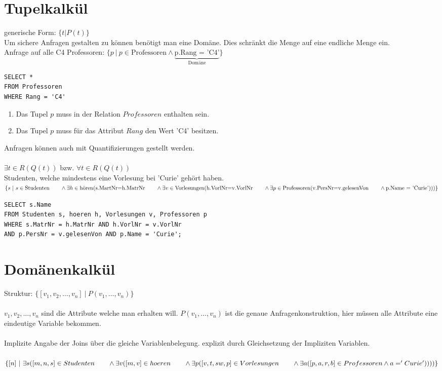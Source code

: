 \section{Tupelkalkül}
generische Form: $\{t|P(t)\}$\\
Um sichere Anfragen gestalten zu können benötigt man eine Domäne. Dies schränkt die Menge auf eine endliche Menge ein.\\
Anfrage auf alle C4 Professoren: $\{p~|~p\in \text{Professoren} \wedge \underbrace{\text{p.Rang = 'C4'}}_{\text{Domäne}}\}$
\begin{lstlisting}
SELECT * 
FROM Professoren
WHERE Rang = 'C4'
\end{lstlisting}
\begin{enumerate}
\item Das Tupel $p$ muss in der Relation $Professoren$ enthalten sein.
\item Das Tupel $p$ muss für das Attribut $Rang$ den Wert 'C4' besitzen. 
\end{enumerate}
Anfragen können auch mit Quantifizierungen gestellt werden.\\
\qquad\\
$\exists t \in R(Q(t))$ bzw. $\forall t \in R(Q(t))$\\
Studenten, welche mindestens eine Vorlesung bei 'Curie' gehört haben.\\
$\{s~|~s \in \text{Studenten}\\
\text{\qquad}\wedge \exists h \in \text{hören}(\text{s.MartNr=h.MatrNr}\\
\text{\qquad } \wedge \exists v \in \text{Vorlesungen}(\text{h.VorlNr=v.VorlNr}\\
\text{\qquad } \wedge \exists p \in \text{Professoren}(\text{v.PersNr=v.gelesenVon}\\
\text{\qquad } \wedge \text{p.Name = 'Curie'})))\}$
\begin{lstlisting}
SELECT s.Name
FROM Studenten s, hoeren h, Vorlesungen v, Professoren p
WHERE s.MatrNr = h.MatrNr AND h.VorlNr = v.VorlNr 
AND p.PersNr = v.gelesenVon AND p.Name = 'Curie';
\end{lstlisting}
\section{Domänenkalkül}
Struktur: $\{[v_1,v_2,\dots,v_n]~|~P(v_1,\dots,v_n)\}$\\
\qquad\\
$v_1,v_2,\dots,v_n$ sind die Attribute welche man erhalten will. $P(v_1,\dots,v_n)$ ist die genaue Anfragenkonstruktion, hier müssen alle Attribute eine eindeutige Variable bekommen. \\
\qquad\\
Implizite Angabe der Joins über die gleiche Variablenbelegung. explizit durch Gleichsetzung der Impliziten Variablen. \\
\qquad\\
$\{[n] ~ | ~ \exists s([m,n,s]\in Studenten \\ 
\text{\qquad}\wedge \exists v([m,v]\in hoeren \\
\text{\qquad}\wedge \exists p ([v,t,sw,p] \in Vorlesungen \\
\text{\qquad}\wedge \exists a ([p,a,r,b] \in Professoren \wedge a = 'Curie'))))\}$

